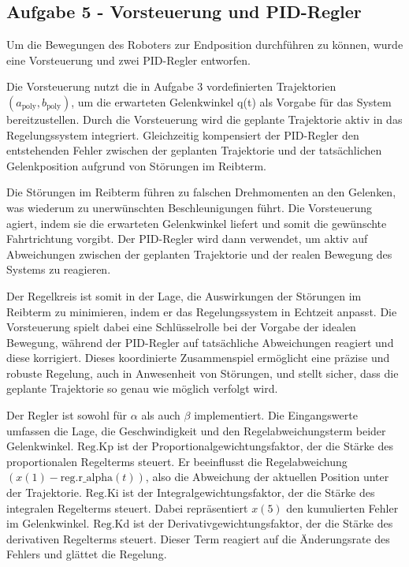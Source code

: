 \subsection*{Aufgabe 5 - Vorsteuerung und PID-Regler}

Um die Bewegungen des Roboters zur Endposition durchführen zu können, wurde eine Vorsteuerung und zwei PID-Regler entworfen.

Die Vorsteuerung nutzt die in Aufgabe 3 vordefinierten Trajektorien $(a_{\text{poly}}, b_{\text{poly}})$, um die erwarteten Gelenkwinkel q(t) als Vorgabe für das System bereitzustellen. Durch die Vorsteuerung wird die geplante Trajektorie aktiv in das Regelungssystem integriert. Gleichzeitig kompensiert der PID-Regler den entstehenden Fehler zwischen der geplanten Trajektorie und der tatsächlichen Gelenkposition aufgrund von Störungen im Reibterm.

Die Störungen im Reibterm führen zu falschen Drehmomenten an den Gelenken, was wiederum zu unerwünschten Beschleunigungen führt. Die Vorsteuerung agiert, indem sie die erwarteten Gelenkwinkel liefert und somit die gewünschte Fahrtrichtung vorgibt. Der PID-Regler wird dann verwendet, um aktiv auf Abweichungen zwischen der geplanten Trajektorie und der realen Bewegung des Systems zu reagieren.

Der Regelkreis ist somit in der Lage, die Auswirkungen der Störungen im Reibterm zu minimieren, indem er das Regelungssystem in Echtzeit anpasst. Die Vorsteuerung spielt dabei eine Schlüsselrolle bei der Vorgabe der idealen Bewegung, während der PID-Regler auf tatsächliche Abweichungen reagiert und diese korrigiert. Dieses koordinierte Zusammenspiel ermöglicht eine präzise und robuste Regelung, auch in Anwesenheit von Störungen, und stellt sicher, dass die geplante Trajektorie so genau wie möglich verfolgt wird.


Der Regler ist sowohl für \(\alpha\) als auch \(\beta\) implementiert. Die Eingangswerte umfassen die Lage, die Geschwindigkeit und den Regelabweichungsterm beider Gelenkwinkel. \(\text{Reg.Kp}\) ist der Proportionalgewichtungsfaktor, der die Stärke des proportionalen Regelterms steuert. Er beeinflusst die Regelabweichung \((x(1) - \text{reg.r\_alpha}(t))\), also die Abweichung der aktuellen Position unter der Trajektorie. \(\text{Reg.Ki}\) ist der Integralgewichtungsfaktor, der die Stärke des integralen Regelterms steuert. Dabei repräsentiert \(x(5)\) den kumulierten Fehler im Gelenkwinkel. \(\text{Reg.Kd}\) ist der Derivativgewichtungsfaktor, der die Stärke des derivativen Regelterms steuert. Dieser Term reagiert auf die Änderungsrate des Fehlers und glättet die Regelung.


